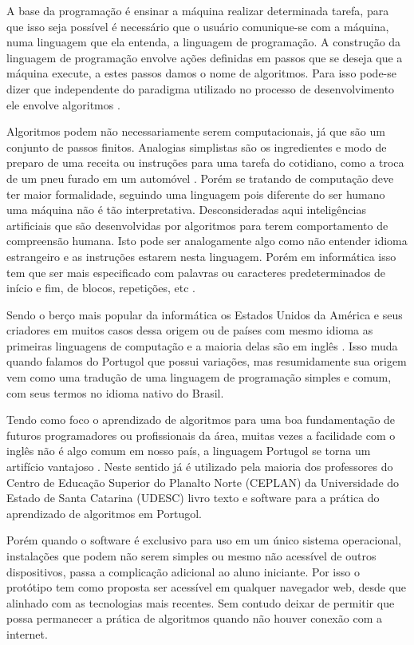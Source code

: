 \ifdraft{\color{green}}{}A base da programação é ensinar a máquina realizar determinada tarefa, para que isso seja possível é necessário que o usuário comunique-se com a máquina, numa linguagem que ela entenda, a linguagem de programação. A construção da linguagem de programação envolve ações definidas em passos que se deseja que a máquina execute, a estes passos damos o nome de algoritmos. Para isso pode-se dizer que independente do paradigma utilizado no processo de desenvolvimento ele envolve algoritmos \cite{medeiros2015}.

Algoritmos podem não necessariamente serem computacionais, já que são um conjunto de passos finitos. Analogias simplistas são os ingredientes e modo de preparo de uma receita ou instruções para uma tarefa do cotidiano, como a troca de um pneu furado em um automóvel \cite{medina2006etal}. Porém se tratando de computação deve ter maior formalidade, seguindo uma linguagem pois diferente do ser humano uma máquina não é tão interpretativa. Desconsideradas aqui inteligências artificiais que são desenvolvidas por algoritmos para terem  comportamento de compreensão humana. Isto pode ser analogamente algo como não entender idioma estrangeiro e as instruções estarem nesta linguagem. Porém em informática isso tem que ser mais especificado com palavras ou caracteres predeterminados de início e fim, de blocos, repetições, etc \cite{dershem1990etal}.

Sendo o berço mais popular da informática os Estados Unidos da América e seus criadores em muitos casos dessa origem ou de países com mesmo idioma as primeiras linguagens de computação e a maioria delas são em inglês \cite{sebesta2009}. Isso muda quando falamos do Portugol que possui variações, mas resumidamente sua origem vem como uma tradução de uma linguagem de programação simples e comum, com seus termos no idioma nativo do Brasil.

Tendo como foco o aprendizado de algoritmos para uma boa fundamentação de futuros programadores ou profissionais da área, muitas vezes a facilidade com o inglês não é algo comum em nosso país, a linguagem Portugol se torna um artifício vantajoso \cite{jesus2004etal}.  Neste sentido já é utilizado pela maioria dos professores do Centro de Educação Superior do Planalto Norte (CEPLAN) da Universidade do Estado de Santa Catarina (UDESC) livro texto e software para a prática do aprendizado de algoritmos em Portugol.

Porém quando o software é exclusivo para uso em um único sistema operacional, instalações que podem não serem simples ou mesmo não acessível de outros dispositivos, passa a complicação adicional ao aluno iniciante. Por isso o protótipo tem como proposta ser acessível em qualquer navegador web, desde que alinhado com as tecnologias mais recentes. Sem contudo deixar de permitir que possa permanecer a prática de algoritmos quando não houver conexão com a internet.
